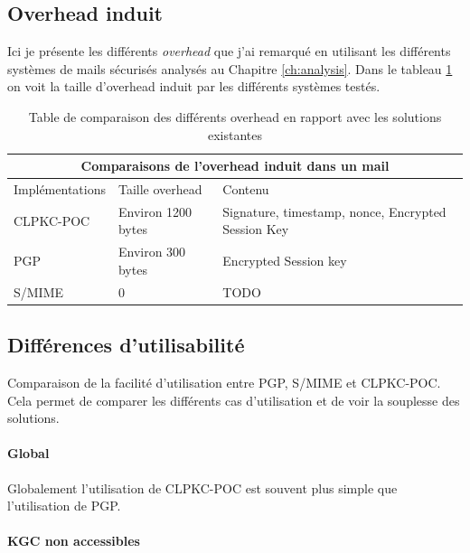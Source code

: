 \subsection{Overhead induit}
Ici je présente les différents \textit{overhead} que j'ai remarqué en utilisant les différents systèmes de mails sécurisés analysés au Chapitre \ref{ch:analysis}. Dans le tableau \ref{table:comparisonOverhead} on voit la taille d'overhead induit par les différents systèmes testés.
\begin{table}[h!]
	\centering
	\begin{tabular}{ |p{3cm}||p{5cm}|p{6cm}| }
		\hline
		\multicolumn{3}{|c|}{Comparaisons de l'overhead induit dans un mail} \\
		\hline
		Implémentations & Taille overhead & Contenu\\
		\hline
		CLPKC-POC   & Environ 1200 bytes & Signature, timestamp, nonce, Encrypted Session Key\\
		PGP & Environ 300 bytes & Encrypted Session key\\
		S/MIME & 0 & TODO\\
		\hline
	\end{tabular}
	\caption{Table de comparaison des différents overhead en rapport avec les solutions existantes }
	\label{table:comparisonOverhead}
\end{table}

\subsection{Différences d'utilisabilité}
Comparaison de la facilité d'utilisation entre PGP, S/MIME et CLPKC-POC. Cela permet de comparer les différents cas d'utilisation et de voir la souplesse des solutions.

\paragraph*{Global}
Globalement l'utilisation de CLPKC-POC est souvent plus simple que l'utilisation de PGP. 
\paragraph*{KGC non accessibles}